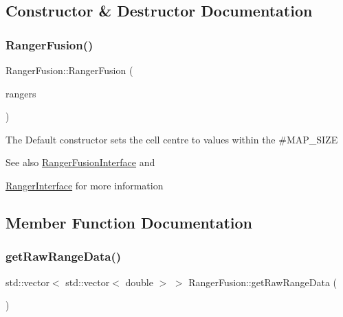 \subsection{Constructor \& Destructor Documentation}
\mbox{\label{classRangerFusion_ae06d13fa52742f42e138b386e5022168}} 
\subsubsection{\texorpdfstring{Ranger\+Fusion()}{RangerFusion()}}
{\footnotesize\ttfamily Ranger\+Fusion\+::\+Ranger\+Fusion (\begin{DoxyParamCaption}\item[{std\+::vector$<$ \hyperlink{classRangerInterface}{Ranger\+Interface} $\ast$$>$}]{rangers }\end{DoxyParamCaption})}

The Default constructor sets the cell centre to values within the \#\+M\+A\+P\+\_\+\+S\+I\+ZE~\newline
\begin{DoxySeeAlso}{See also}
\hyperlink{classRangerFusionInterface}{Ranger\+Fusion\+Interface} and 

\hyperlink{classRangerInterface}{Ranger\+Interface} for more information 
\end{DoxySeeAlso}


\subsection{Member Function Documentation}
\mbox{\label{classRangerFusion_a5780383fdffe121a7a2372a047819ba9}} 
\subsubsection{\texorpdfstring{get\+Raw\+Range\+Data()}{getRawRangeData()}}
{\footnotesize\ttfamily std\+::vector$<$ std\+::vector$<$ double $>$ $>$ Ranger\+Fusion\+::get\+Raw\+Range\+Data (\begin{DoxyParamCaption}{ }\end{DoxyParamCaption})\hspace{0.3cm}{\ttfamily [virtual]}}



